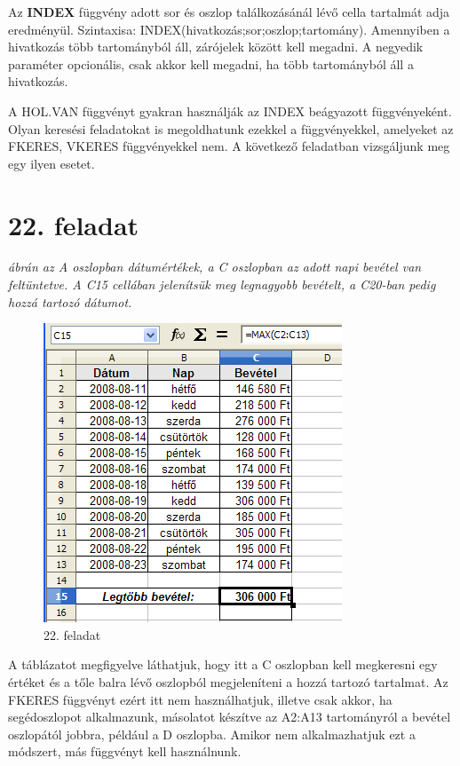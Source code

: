 Az \textbf{INDEX} függvény adott sor és oszlop
találkozásánál lévő cella tartalmát adja
eredményül. Szintaxisa: INDEX(hivatkozás;sor;oszlop;tartomány).
Amennyiben a hivatkozás több tartományból  áll,
zárójelek között kell megadni. A negyedik paraméter
opcionális, csak akkor kell megadni, ha  több tartományból
áll a hivatkozás.

A HOL.VAN függvényt gyakran használják az INDEX beágyazott
függvényeként. Olyan keresési feladatokat is megoldhatunk
ezekkel a függvényekkel, amelyeket az FKERES, VKERES
függvényekkel nem. A következő feladatban vizsgáljunk meg
egy ilyen esetet.


\section{22. feladat}

{\itshape
{} ábrán az A oszlopban dátumértékek, a C oszlopban az
adott napi bevétel van feltüntetve. A C15 cellában jelenítsük
meg legnagyobb bevételt, a C20-ban pedig hozzá tartozó
dátumot.}

\begin{figure}[!h]
\begin{center}
\includegraphics[width=8.888cm]{oocalcv2-img102.png}
\caption{22. feladat}\label{22-feladat}
\end{center}
\end{figure}

A táblázatot megfigyelve láthatjuk, hogy itt a C oszlopban kell
megkeresni egy értéket és a tőle balra lévő oszlopból
megjeleníteni a hozzá tartozó tartalmat. Az FKERES függvényt
ezért itt nem használhatjuk, illetve csak akkor, ha segédoszlopot
alkalmazunk, másolatot készítve az A2:A13 tartományról a
bevétel oszlopától jobbra, például a D oszlopba. Amikor nem
alkalmazhatjuk ezt a módszert, más függvényt kell
használnunk.

